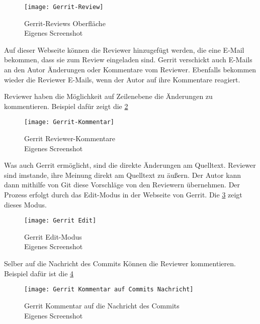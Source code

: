 \begin{figure}[H]
	\centering
	\texttt{[image: Gerrit-Review]}
	\caption[Gerrit Reviews Oberfläche]{Gerrit-Reviews Oberfläche\\Eigenes Screenshot}
	\label{fig:Gerrit-Review}
\end{figure}

Auf dieser Webseite können die Reviewer hinzugefügt werden, die eine E-Mail bekommen, dass sie zum Review eingeladen sind. Gerrit verschickt auch E-Mails an den Autor Änderungen oder Kommentare vom Reviewer. Ebenfalls bekommen wieder die Reviewer E-Mails, wenn der Autor auf ihre Kommentare reagiert.

Reviewer haben die Möglichkeit auf Zeilenebene die Änderungen zu kommentieren. Beispiel dafür zeigt die \cref{fig:Gerrit Reviewer-Kommentare} 

\begin{figure}[H]
	\centering
	\texttt{[image: Gerrit-Kommentar]}
	\caption[Gerrit Reviewer-Kommentare]{Gerrit Reviewer-Kommentare\\Eigenes Screenshot}
	\label{fig:Gerrit Reviewer-Kommentare}
\end{figure}

Was auch Gerrit ermöglicht, sind die direkte Änderungen am Quelltext. Reviewer sind imstande, ihre Meinung direkt am Quelltext zu äußern. Der Autor kann dann mithilfe von Git diese Vorschläge von den Reviewern übernehmen. Der Prozess erfolgt durch das Edit-Modus in der Webseite von Gerrit. Die \cref{fig:Gerrit Edit-Modus} zeigt dieses Modus.

\begin{figure}[H]
	\centering
	\texttt{[image: Gerrit Edit]}
	\caption[Gerrit Edit-Modus]{Gerrit Edit-Modus\\Eigenes Screenshot}
	\label{fig:Gerrit Edit-Modus}
\end{figure}

Selber auf die Nachricht des Commits Können die Reviewer kommentieren. Beispiel dafür ist die \ref{fig:Gerrit Kommentar auf Commits Nachricht}

\begin{figure}[H]
	\centering
	\texttt{[image: Gerrit Kommentar auf Commits Nachricht]}
	\caption[Gerrit Kommentar auf die Nachricht des Commits]{Gerrit Kommentar auf die Nachricht des Commits\\Eigenes Screenshot}
	\label{fig:Gerrit Kommentar auf Commits Nachricht}
\end{figure}

